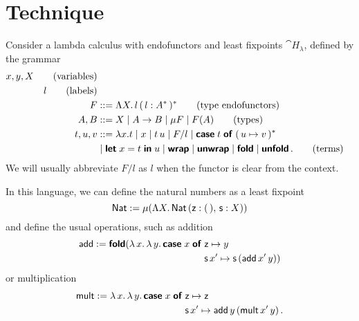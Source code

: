 \section{Technique}\label{sec:technique}

Consider a lambda calculus with endofunctors and least fixpoints
$\cat{H}_\lambda$, defined by the grammar
\begin{align*}
  x,y, X  \tag{variables}                                                                                                \\
  l  \tag{labels}                                                                                                        \\
  F       & ::= \Lambda X .  \, l \, (\, l : A^* \,)^* \tag{type endofunctors}                                           \\
  A, B    & ::= X \mid A \to B \mid \mu F \mid F(A) \tag{types}                                                          \\
  t, u, v & ::= \lambda x . t \mid x \mid t\,u \mid F / l \mid \textsf{\textbf{case}}\; {t}\; \textsf{\textbf{of}}\; (\, {u} \mapsto {v} \,)^*                      \\
          & \mid \textsf{\textbf{let}}\; {x} = {t}\; \textsf{\textbf{in}}\; {u} \mid \textsf{\textbf{wrap}} \mid \textsf{\textbf{unwrap}} \mid \textsf{\textbf{fold}} \mid \textsf{\textbf{unfold}} \,. \tag{terms}
\end{align*}
We will usually abbreviate $F / l$ as $l$ when the functor is clear from the context.

In this language, we can define the natural numbers as a least fixpoint
\[
  \textsf{Nat} := \mu (\Lambda X . \, \textsf{Nat} \, (\textsf{z} : (\,),\, \textsf{s} : X))
\]
and define the usual operations, such as addition
\begin{align*}
  \textsf{add} := \textsf{\textbf{fold}} (\lambda \, x . \, \lambda \, y . \, \textsf{\textbf{case}}\; {x}\; \textsf{\textbf{of}}\; & {\textsf{z}} \mapsto {y}                                 \\
                                                                       & {\textsf{s}\,x'} \mapsto {\textsf{s}\,(\textsf{add}\,x'\, y)}) \\
\end{align*}
or multiplication
\begin{align*}
  \textsf{mult} := \lambda \, x . \, \lambda \, y . \, \textsf{\textbf{case}}\; {x}\; \textsf{\textbf{of}}\; & {\textsf{z}} \mapsto {\textsf{z}}                                    \\
                                                           & {\textsf{s}\,x'} \mapsto {\textsf{add}\,y\,(\textsf{mult}\,x'\, y)} \,.
\end{align*}
